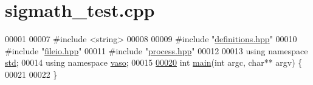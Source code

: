 \hypertarget{sigmath__test_8cpp_source}{\section{sigmath\+\_\+test.\+cpp}
\label{sigmath__test_8cpp_source}
}

\begin{DoxyCode}
00001 
00007 \textcolor{preprocessor}{#include <string>}
00008 
00009 \textcolor{preprocessor}{#include "\hyperlink{definitions_8hpp}{definitions.hpp}"}
00010 \textcolor{preprocessor}{#include "\hyperlink{fileio_8hpp}{fileio.hpp}"}
00011 \textcolor{preprocessor}{#include "\hyperlink{process_8hpp}{process.hpp}"}
00012 
00013 \textcolor{keyword}{using namespace }\hyperlink{namespacestd}{std};
00014 \textcolor{keyword}{using namespace }\hyperlink{namespacevaso}{vaso};
00015 
\hypertarget{sigmath__test_8cpp_source_l00020}{}\hyperlink{sigmath__test_8cpp_a3c04138a5bfe5d72780bb7e82a18e627}{00020} \textcolor{keywordtype}{int} \hyperlink{sigmath__test_8cpp_a3c04138a5bfe5d72780bb7e82a18e627}{main}(\textcolor{keywordtype}{int} argc, \textcolor{keywordtype}{char}** argv) \{
00021 
00022 \}
\end{DoxyCode}
